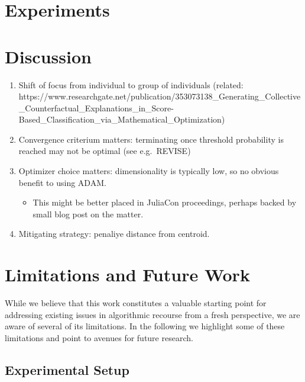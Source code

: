 \documentclass[
  conference]{IEEEtran}
\providecommand{\tightlist}{%
  \setlength{\itemsep}{0pt}\setlength{\parskip}{0pt}}\usepackage{longtable,booktabs,array}
\begin{document}
\hypertarget{sec-empirical}{%
\section{Experiments}\label{sec-empirical}}

\hypertarget{sec-discussion}{%
\section{Discussion}\label{sec-discussion}}

\begin{enumerate}
\def\labelenumi{\arabic{enumi}.}
\tightlist
\item
  Shift of focus from individual to group of individuals (related:
  https://www.researchgate.net/publication/353073138\_Generating\_Collective\_Counterfactual\_Explanations\_in\_Score-Based\_Classification\_via\_Mathematical\_Optimization)
\item
  Convergence criterium matters: terminating once threshold probability
  is reached may not be optimal (see e.g.~REVISE)
\item
  Optimizer choice matters: dimensionality is typically low, so no
  obvious benefit to using ADAM.

  \begin{itemize}
  \tightlist
  \item
    This might be better placed in JuliaCon proceedings, perhaps backed
    by small blog post on the matter.
  \end{itemize}
\item
  Mitigating strategy: penaliye distance from centroid.
\end{enumerate}

\hypertarget{sec-limit}{%
\section{Limitations and Future Work}\label{sec-limit}}

While we believe that this work constitutes a valuable starting point
for addressing existing issues in algorithmic recourse from a fresh
perspective, we are aware of several of its limitations. In the
following we highlight some of these limitations and point to avenues
for future research.

\hypertarget{experimental-setup}{%
\subsection{Experimental Setup}\label{experimental-setup}}
\end{document}
